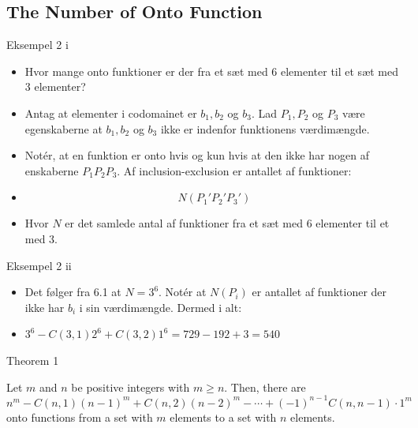 \documentclass{beamer}
\begin{document}
\subsection{The Number of Onto Function}
\begin{frame}{Eksempel 2 i}
\begin{itemize}
    \item<1-> Hvor mange onto funktioner er der fra et sæt med 6 elementer til et sæt med 3 elementer? 
    \item<2-> Antag at elementer i codomainet er $b_1, b_2$ og $b_3$. Lad $P_1, P_2$ og $P_3$ være egenskaberne at $b_1,b_2$ og $b_3$ ikke er indenfor funktionens værdimængde. 
    \item<2-> Notér, at en funktion er onto hvis og kun hvis at den ikke har nogen af enskaberne $P_1P_2P_3$. Af inclusion-exclusion er antallet af funktioner:
    \item<2-> $$N(P_1'P_2'P_3')$$
    \item<2-> Hvor $N$ er det samlede antal af funktioner fra et sæt med 6 elementer til et med 3. 
\end{itemize}    
\end{frame}

\begin{frame}{Eksempel 2 ii}
   \begin{itemize}
    \item<1-> Det følger fra 6.1 at $N = 3^6$. Notér at $N(P_i)$ er antallet af funktioner der ikke har $b_i$ i sin værdimængde. Dermed i alt: 
    \item<2-> $3^6 - C(3,1)2^6 + C(3,2)1^6 = 729-192+3=540$
   \end{itemize} 
\end{frame}

\begin{frame}{Theorem 1}
   \begin{theorem}
       Let $m$ and $n$ be positive integers with $m \geq n$. Then, there are
       $$n^m - C(n,1)(n-1)^m+C(n,2)(n-2)^m- \cdots + (-1)^{n-1}C(n,n-1) \cdot 1^m$$
       onto functions from a set with $m$ elements to a set with $n$ elements. 
   \end{theorem} 
\end{frame}
\end{document}
